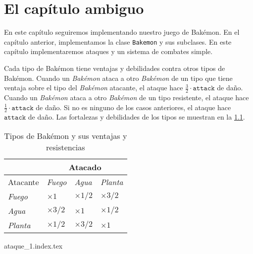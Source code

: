 \chapter{El capítulo ambiguo}
  \label{chap:ambiguo}
    
  En este capítulo seguiremos implementando nuestro juego de Bakémon.
  En el capítulo anterior, implementamos la clase \texttt{Bakemon} y sus subclases.
  En este capítulo implementaremos ataques y un sistema de combates simple.

  Cada tipo de Bakémon tiene ventajas y debilidades contra otros tipos de Bakémon.
  Cuando un \textit{Bakémon} ataca a otro \textit{Bakémon} de un tipo que tiene ventaja
  sobre el tipo del \textit{Bakémon} atacante, el ataque hace 
  \(\frac{3}{2} \cdot \mathtt{attack}\) de daño.
  Cuando un \textit{Bakémon} ataca a otro \textit{Bakémon} de un tipo resistente, el ataque
  hace \(\frac{1}{2} \cdot \mathtt{attack}\) de daño.
  Si no es ninguno de los casos anteriores, el ataque hace \(\mathtt{attack}\) de daño.
  Las fortalezas y debilidades de los tipos se muestran en la \cref{tab:tipos}.

  \begin{table}[ht!]
    \centering
    \begin{tabular}{ |p{2cm}|p{2cm}|p{2cm}|p{2cm}|  }
      \hline
                & \multicolumn{3}{|c|}{Atacado} \\
      \hline
      Atacante  & \textit{Fuego}              & \textit{Agua}           & \textit{Planta} \\
      \hline
      \textit{Fuego}  & \(\times 1\)           & \(\times 1/2\)         & \(\times 3/2\) \\
      \hline
      \textit{Agua}   & \(\times 3/2\)         & \(\times 1\)           & \(\times 1/2\) \\
      \hline
      \textit{Planta} & \(\times 1/2\)         & \(\times 3/2\)         & \(\times 1\) \\
      \hline
      \end{tabular}
    \caption{Tipos de Bakémon y sus ventajas y resistencias}
    \label{tab:tipos}
  \end{table}

  {ataque_1.index.tex}
  
  \printbibliography[keyword=double-dispatch]